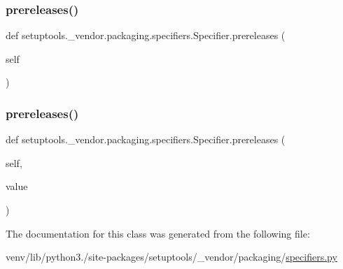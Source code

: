 \subsubsection{\texorpdfstring{prereleases()}{prereleases()}\hspace{0.1cm}{\footnotesize\ttfamily [1/2]}}
{\footnotesize\ttfamily def setuptools.\+\_\+vendor.\+packaging.\+specifiers.\+Specifier.\+prereleases (\begin{DoxyParamCaption}\item[{}]{self }\end{DoxyParamCaption})}

\mbox{\label{classsetuptools_1_1__vendor_1_1packaging_1_1specifiers_1_1Specifier_a6ba68d7e24800548e4ce987f0b05e174}} 
\subsubsection{\texorpdfstring{prereleases()}{prereleases()}\hspace{0.1cm}{\footnotesize\ttfamily [2/2]}}
{\footnotesize\ttfamily def setuptools.\+\_\+vendor.\+packaging.\+specifiers.\+Specifier.\+prereleases (\begin{DoxyParamCaption}\item[{}]{self,  }\item[{}]{value }\end{DoxyParamCaption})}



The documentation for this class was generated from the following file\+:\begin{DoxyCompactItemize}
\item 
venv/lib/python3./site-\/packages/setuptools/\+\_\+vendor/packaging/\hyperlink{setuptools_2__vendor_2packaging_2specifiers_8py}{specifiers.\+py}\end{DoxyCompactItemize}
